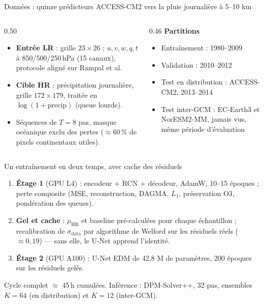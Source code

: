 \documentclass[aspectratio=169,10pt]{beamer}
\newcommand{\HR}{\mathrm{HR}}
\newcommand{\muHR}{\mu_{\HR}}
\begin{document}
\begin{frame}{Données : quinze prédicteurs ACCESS-CM2 vers la pluie journalière à 5--10 km}
  \begin{columns}[T]
    \begin{column}{0.50\textwidth}
      \small
      \begin{itemize}
        \item \textbf{Entrée LR} : grille $23\times 26$ ; $u, v, w, q, t$ à
              850/500/250\,hPa (15 canaux), protocole aligné sur Rampal et al.
        \item \textbf{Cible HR} : précipitation journalière, grille $172\times 179$,
              traitée en $\log(1+\mathrm{precip})$ (queue lourde).
        \item Séquences de $T=8$ pas, masque océanique exclu des pertes
              ($\approx 60\,\%$ de pixels continentaux utiles).
      \end{itemize}
    \end{column}
    \begin{column}{0.46\textwidth}
      \small
      \textbf{Partitions}
      \begin{itemize}
        \item Entraînement : 1980--2009
        \item Validation : 2010--2012
        \item Test en distribution : ACCESS-CM2, 2013--2014
        \item \alert{Test inter-GCM} : EC-Earth3 et NorESM2-MM, jamais vus,
              même période d'évaluation
      \end{itemize}
    \end{column}
  \end{columns}
\end{frame}

\begin{frame}{Un entraînement en deux temps, avec cache des résiduels}
  \begin{enumerate}
    \item \textbf{Étage 1} (GPU L4) : encodeur $+$ RCN $+$ décodeur, AdamW,
          10--15 époques ; perte composite (MSE, reconstruction, DAGMA, $L_1$,
          préservation O3, pondération des queues).
    \item \textbf{Gel et cache} : $\muHR$ et baseline pré-calculées pour chaque
          échantillon ; recalibration de $\sigma_{\mathrm{data}}$ par algorithme de
          Welford sur les résiduels réels ($\approx 0{,}19$) --- sans elle, le U-Net
          apprend l'identité.
    \item \textbf{Étage 2} (GPU A100) : U-Net EDM de 42,8 M de paramètres,
          200 époques sur les résiduels gelés.
  \end{enumerate}
  \vspace{0.15cm}
  \small Cycle complet $\approx$ 45\,h cumulées. Inférence : DPM-Solver++, 32 pas,
  ensembles $K = 64$ (en distribution) et $K = 12$ (inter-GCM).
\end{frame}
\end{document}
